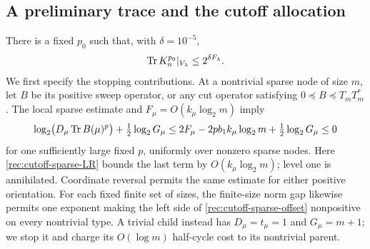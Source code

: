\subsection{A preliminary trace and the cutoff allocation}

There is a fixed $p_0$ such that, with $\delta=10^{-5}$,
\begin{equation}\label{rec:cutoff-preliminary-trace}
 \operatorname{Tr} K_n^{p_0}|_{V_\lambda}\le2^{\delta F_\lambda}.
\end{equation}
We first specify the stopping contributions.  At a nontrivial sparse
node of size $m$, let $B$ be its positive sweep operator, or any cut
operator satisfying $0\preceq B\preceq T_mT_m^*$.  The local sparse
estimate and $F_\mu=O(k_\mu\log_2m)$ imply
\begin{equation}\label{rec:cutoff-sparse-offset}
 \log_2\bigl(D_\mu\operatorname{Tr} B(\mu)^p\bigr)
       +\tfrac12\log_2G_\mu
 \le 2F_\mu-2p b_1 k_\mu\log_2m
       +\tfrac12\log_2G_\mu\le0
\end{equation}
for one sufficiently large fixed $p$, uniformly over nonzero sparse
nodes.  Here \eqref{rec:cutoff-sparse-LR} bounds the last term by
$O(k_\mu\log_2m)$; level one is annihilated.  Coordinate reversal
permits the same estimate for either positive orientation.  For each
fixed finite set of sizes, the finite-size norm gap likewise permits
one exponent making the left side of \eqref{rec:cutoff-sparse-offset}
nonpositive on every nontrivial type.  A trivial child instead has
$D_\mu=t_\mu=1$ and $G_\mu=m+1$; we stop it and charge its
$O(\log m)$ half-cycle cost to its nontrivial parent.

